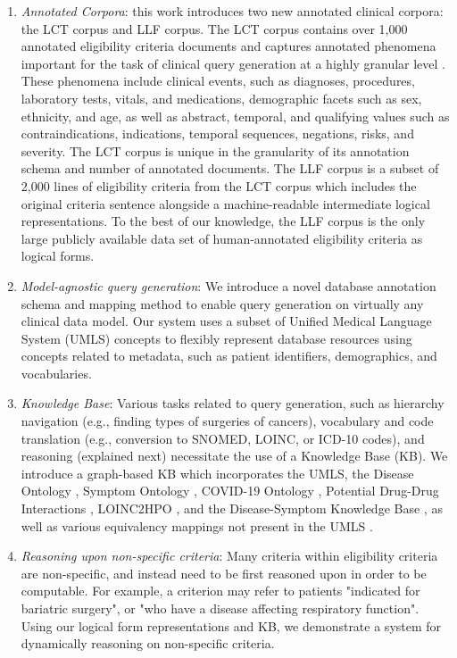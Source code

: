 \documentclass[../main.tex]{subfiles}
\begin{document}
\begin{enumerate}
    \item \textit{Annotated Corpora}: this work introduces two new annotated clinical corpora: the LCT corpus and LLF corpus. The LCT corpus contains over 1,000 annotated eligibility criteria documents and captures annotated phenomena important for the task of clinical query generation at a highly granular level \cite{dobbins2022leaf}. These phenomena include clinical events, such as diagnoses, procedures, laboratory tests, vitals, and medications, demographic facets such as sex, ethnicity, and age, as well as abstract, temporal, and qualifying values such as contraindications, indications, temporal sequences, negations, risks, and severity. The LCT corpus is unique in the granularity of its annotation schema and number of annotated documents. The LLF corpus is a subset of 2,000 lines of eligibility criteria from the LCT corpus which includes the original criteria sentence alongside a machine-readable intermediate logical representations. To the best of our knowledge, the LLF corpus is the only large publicly available data set of human-annotated eligibility criteria as logical forms.
    \item \textit{Model-agnostic query generation}: We introduce a novel database annotation schema and mapping method to enable query generation on virtually any clinical data model. Our system uses a subset of Unified Medical Language System (UMLS) \cite{bodenreider2004unified} concepts to flexibly represent database resources using concepts related to metadata, such as patient identifiers, demographics, and vocabularies.
    \item \textit{Knowledge Base}: Various tasks related to query generation, such as hierarchy navigation (e.g., finding types of surgeries of cancers), vocabulary and code translation (e.g., conversion to SNOMED, LOINC, or ICD-10 codes), and reasoning (explained next) necessitate the use of a Knowledge Base (KB). We introduce a graph-based KB which incorporates the UMLS, the Disease Ontology \cite{schriml2012disease}, Symptom Ontology \cite{sayers2010database}, COVID-19 Ontology \cite{sargsyan2020covid}, Potential Drug-Drug Interactions \cite{ayvaz2015toward}, LOINC2HPO \cite{zhang2019semantic}, and the Disease-Symptom Knowledge Base \cite{wang2008automated}, as well as various equivalency mappings not present in the UMLS \cite{icd9_icd10_icd10pcs, icd9dx_snomed, icd9proc_snomed, snomed_icd10}.
    \item \textit{Reasoning upon non-specific criteria}: Many criteria within eligibility criteria are non-specific, and instead need to be first reasoned upon in order to be computable. For example, a criterion may refer to patients "indicated for bariatric surgery", or "who have a disease affecting respiratory function". Using our logical form representations and KB, we demonstrate a system for dynamically reasoning on non-specific criteria.

\end{enumerate}
\end{document}
